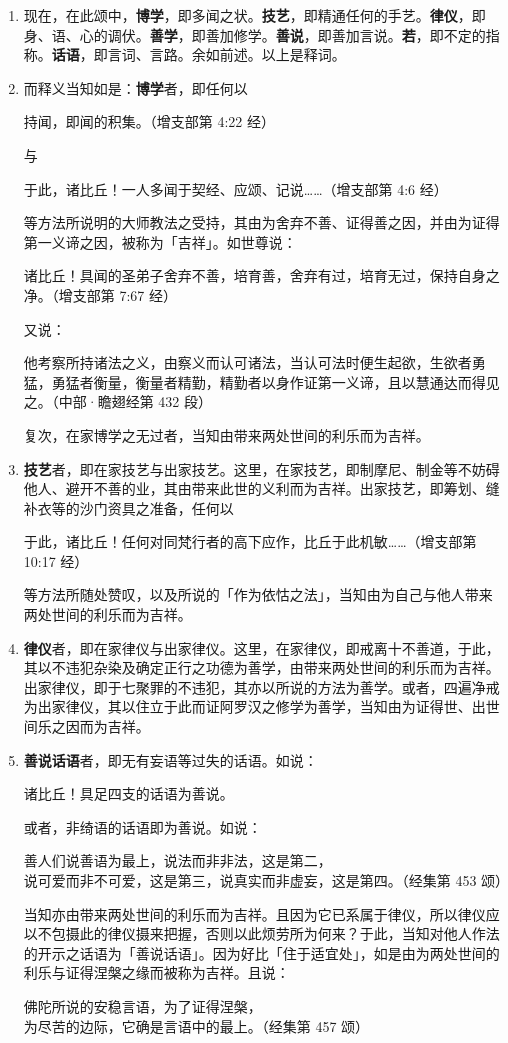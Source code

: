 \begin{enumerate}\item 现在，在此颂中，\textbf{博学}，即多闻之状。\textbf{技艺}，即精通任何的手艺。\textbf{律仪}，即身、语、心的调伏。\textbf{善学}，即善加修学。\textbf{善说}，即善加言说。\textbf{若}，即不定的指称。\textbf{话语}，即言词、言路。余如前述。以上是释词。
\item 而释义当知如是：\textbf{博学}者，即任何以\begin{quoting}持闻，即闻的积集。（增支部第 4:22 经）\end{quoting}与\begin{quoting}于此，诸比丘！一人多闻于契经、应颂、记说……（增支部第 4:6 经）\end{quoting}等方法所说明的大师教法之受持，其由为舍弃不善、证得善之因，并由为证得第一义谛之因，被称为「吉祥」。如世尊说：\begin{quoting}诸比丘！具闻的圣弟子舍弃不善，培育善，舍弃有过，培育无过，保持自身之净。（增支部第 7:67 经）\end{quoting}又说：\begin{quoting}他考察所持诸法之义，由察义而认可诸法，当认可法时便生起欲，生欲者勇猛，勇猛者衡量，衡量者精勤，精勤者以身作证第一义谛，且以慧通达而得见之。（中部·瞻翅经第 432 段）\end{quoting}复次，在家博学之无过者，当知由带来两处世间的利乐而为吉祥。
\item \textbf{技艺}者，即在家技艺与出家技艺。这里，在家技艺，即制摩尼、制金等不妨碍他人、避开不善的业，其由带来此世的义利而为吉祥。出家技艺，即筹划、缝补衣等的沙门资具之准备，任何以\begin{quoting}于此，诸比丘！任何对同梵行者的高下应作，比丘于此机敏……（增支部第 10:17 经）\end{quoting}等方法所随处赞叹，以及所说的「作为依怙之法」，当知由为自己与他人带来两处世间的利乐而为吉祥。
\item \textbf{律仪}者，即在家律仪与出家律仪。这里，在家律仪，即戒离十不善道，于此，其以不违犯杂染及确定正行之功德为善学，由带来两处世间的利乐而为吉祥。出家律仪，即于七聚罪的不违犯，其亦以所说的方法为善学。或者，四遍净戒为出家律仪，其以住立于此而证阿罗汉之修学为善学，当知由为证得世、出世间乐之因而为吉祥。
\item \textbf{善说话语}者，即无有妄语等过失的话语。如说：\begin{quoting}诸比丘！具足四支的话语为善说。\end{quoting}或者，非绮语的话语即为善说。如说：\begin{quoting}善人们说善语为最上，说法而非非法，这是第二，\\说可爱而非不可爱，这是第三，说真实而非虚妄，这是第四。（经集第 453 颂）\end{quoting}当知亦由带来两处世间的利乐而为吉祥。且因为它已系属于律仪，所以律仪应以不包摄此的律仪摄来把握，否则以此烦劳所为何来？于此，当知对他人作法的开示之话语为「善说话语」。因为好比「住于适宜处」，如是由为两处世间的利乐与证得涅槃之缘而被称为吉祥。且说：\begin{quoting}佛陀所说的安稳言语，为了证得涅槃，\\为尽苦的边际，它确是言语中的最上。（经集第 457 颂）\end{quoting}

\end{enumerate}
